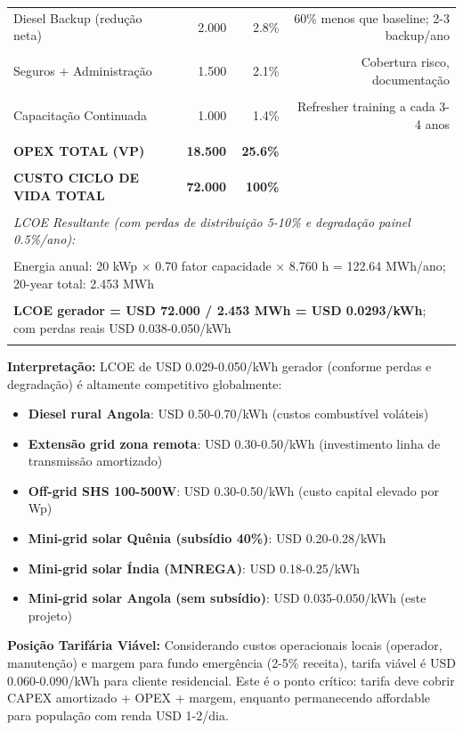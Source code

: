 \documentclass[12pt, a4paper]{article}
\begin{document}
\begin{table}[H]
\begin{tabular}{lrrr}
Diesel Backup (redução neta) & 2.000 & 2.8\% & 60\% menos que baseline; 2-3 backup/ano \\\\
Seguros + Administração & 1.500 & 2.1\% & Cobertura risco, documentação \\\\
Capacitação Continuada & 1.000 & 1.4\% & Refresher training a cada 3-4 anos \\\\
\midrule\textbf{OPEX TOTAL (VP)} &\textbf{18.500} &\textbf{25.6\%} & \\\\
\midrule\textbf{CUSTO CICLO DE VIDA TOTAL} &\textbf{72.000} &\textbf{100\%} & \\\\
\midrule
\multicolumn{4}{l}{\small\textit{LCOE Resultante (com perdas de distribuição 5-10\% e degradação painel 0.5\%/ano):}} \\\\
\multicolumn{4}{l}{\small Energia anual: 20 kWp × 0.70 fator capacidade × 8.760 h = 122.64 MWh/ano; 20-year total: 2.453 MWh} \\\\
\multicolumn{4}{l}{\small\textbf{LCOE gerador = USD 72.000 / 2.453 MWh = USD 0.0293/kWh}; com perdas reais USD 0.038-0.050/kWh} \\\\
\bottomrule
\end{tabular}
\end{table}\textbf{Interpretação:} LCOE de USD 0.029-0.050/kWh gerador (conforme perdas e degradação) é altamente competitivo globalmente:
\begin{itemize}
\item\textbf{Diesel rural Angola}: USD 0.50-0.70/kWh (custos combustível voláteis)
\item\textbf{Extensão grid zona remota}: USD 0.30-0.50/kWh (investimento linha de transmissão amortizado)
\item\textbf{Off-grid SHS 100-500W}: USD 0.30-0.50/kWh (custo capital elevado por Wp)
\item\textbf{Mini-grid solar Quênia (subsídio 40\%)}: USD 0.20-0.28/kWh
\item\textbf{Mini-grid solar Índia (MNREGA)}: USD 0.18-0.25/kWh
\item\textbf{Mini-grid solar Angola (sem subsídio)}: USD 0.035-0.050/kWh (este projeto)
\end{itemize}\textbf{Posição Tarifária Viável:} Considerando custos operacionais locais (operador, manutenção) e margem para fundo emergência (2-5\% receita), tarifa viável é USD 0.060-0.090/kWh para cliente residencial. Este é o ponto crítico: tarifa deve cobrir CAPEX amortizado + OPEX + margem, enquanto permanecendo affordable para população com renda USD 1-2/dia.
\end{document}
